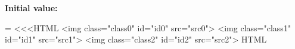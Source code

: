 {\bfseries Initial value\+:}
\begin{DoxyCode}
= <<<HTML
<img 
\textcolor{keyword}{class}=\textcolor{stringliteral}{"class0"} \textcolor{keywordtype}{id}=\textcolor{stringliteral}{"id0"} src=\textcolor{stringliteral}{"src0"}>
<img
 \textcolor{keyword}{class}=\textcolor{stringliteral}{"class1"} \textcolor{keywordtype}{id}=\textcolor{stringliteral}{"id1"} src=\textcolor{stringliteral}{"src1"}>
<img \textcolor{keyword}{class}=\textcolor{stringliteral}{"class2"} \textcolor{keywordtype}{id}=\textcolor{stringliteral}{"id2"} src=\textcolor{stringliteral}{"src2"}>
HTML
\end{DoxyCode}
